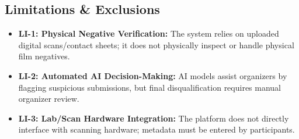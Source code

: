 \subsection{Limitations \& Exclusions}
\begin{itemize}
    \item \textbf{LI-1: Physical Negative Verification:} The system relies on uploaded digital scans/contact sheets; it does not physically inspect or handle physical film negatives.
    \item \textbf{LI-2: Automated AI Decision-Making:} AI models assist organizers by flagging suspicious submissions, but final disqualification requires manual organizer review.
    \item \textbf{LI-3: Lab/Scan Hardware Integration:} The platform does not directly interface with scanning hardware; metadata must be entered by participants.
\end{itemize}
